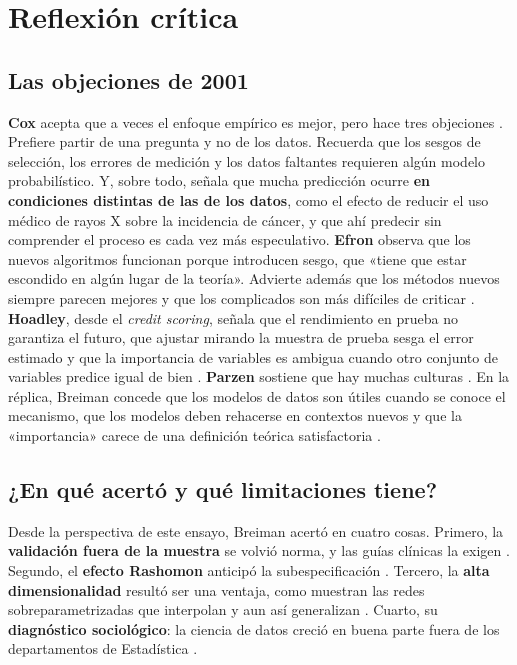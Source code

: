 \documentclass[11pt,a4paper]{article}
\begin{document}
\section{Reflexión crítica}\label{sec-critica}

\subsection{Las objeciones de 2001}

\textbf{Cox} acepta que a veces el enfoque empírico es mejor, pero hace tres objeciones \autocite[216--218]{breiman2001}. Prefiere partir de una pregunta y no de los datos. Recuerda que los sesgos de selección, los errores de medición y los datos faltantes requieren algún modelo probabilístico. Y, sobre todo, señala que mucha predicción ocurre \textbf{en condiciones distintas de las de los datos}, como el efecto de reducir el uso médico de rayos X sobre la incidencia de cáncer, y que ahí predecir sin comprender el proceso es cada vez más especulativo. \textbf{Efron} observa que los nuevos algoritmos funcionan porque introducen sesgo, que «tiene que estar escondido en algún lugar de la teoría». Advierte además que los métodos nuevos siempre parecen mejores y que los complicados son más difíciles de criticar \autocite[218--219]{breiman2001}. \textbf{Hoadley}, desde el \emph{credit scoring}, señala que el rendimiento en prueba no garantiza el futuro, que ajustar mirando la muestra de prueba sesga el error estimado y que la importancia de variables es ambigua cuando otro conjunto de variables predice igual de bien \autocite[220--224]{breiman2001}. \textbf{Parzen} sostiene que hay muchas culturas \autocite[224--226]{breiman2001}. En la réplica, Breiman concede que los modelos de datos son útiles cuando se conoce el mecanismo, que los modelos deben rehacerse en contextos nuevos y que la «importancia» carece de una definición teórica satisfactoria \autocite[226--231]{breiman2001}.

\subsection{¿En qué acertó y qué limitaciones tiene?}

Desde la perspectiva de este ensayo, Breiman acertó en cuatro cosas. Primero, la \textbf{validación fuera de la muestra} se volvió norma, y las guías clínicas la exigen \autocite{collins2024}. Segundo, el \textbf{efecto Rashomon} anticipó la subespecificación \autocite{damour2022}. Tercero, la \textbf{alta dimensionalidad} resultó ser una ventaja, como muestran las redes sobreparametrizadas que interpolan y aun así generalizan \autocite{belkin2019,zhang2017}. Cuarto, su \textbf{diagnóstico sociológico}: la ciencia de datos creció en buena parte fuera de los departamentos de Estadística \autocite{donoho2017}.
\end{document}
